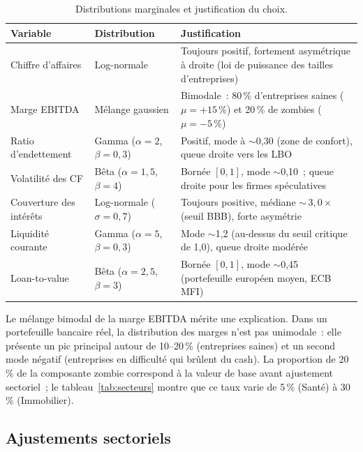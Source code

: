 \documentclass[12pt, a4paper, twoside, openright]{report}
\theoremstyle{definition}
\begin{document}
\begin{table}[htbp]
\centering
\caption{Distributions marginales et justification du choix.}
\label{tab:marginales}
\begin{tabular}{llp{6.5cm}}
\toprule
Variable & Distribution & Justification \\
\midrule
Chiffre d'affaires      & Log-normale & Toujours positif, fortement asymétrique à droite (loi de puissance des tailles d'entreprises) \\
Marge EBITDA            & Mélange gaussien & Bimodale~: 80\,\% d'entreprises saines ($\mu = +15\,\%$) et 20\,\% de zombies ($\mu = -5\,\%$) \\
Ratio d'endettement     & Gamma ($\alpha\!=\!2$, $\beta\!=\!0{,}3$) & Positif, mode à $\sim$0{,}30 (zone de confort), queue droite vers les LBO \\
Volatilité des CF       & Bêta ($\alpha\!=\!1{,}5$, $\beta\!=\!4$) & Bornée $[0, 1]$, mode $\sim$0{,}10~; queue droite pour les firmes spéculatives \\
Couverture des intérêts  & Log-normale ($\sigma\!=\!0{,}7$) & Toujours positive, médiane ${\sim}\,3{,}0\times$ (seuil BBB), forte asymétrie \\
Liquidité courante      & Gamma ($\alpha\!=\!5$, $\beta\!=\!0{,}3$) & Mode $\sim$1{,}2 (au-dessus du seuil critique de 1{,}0), queue droite modérée \\
Loan-to-value           & Bêta ($\alpha\!=\!2{,}5$, $\beta\!=\!3$) & Bornée $[0, 1]$, mode $\sim$0{,}45 (portefeuille européen moyen, ECB MFI) \\
\bottomrule
\end{tabular}
\end{table}

Le mélange bimodal de la marge EBITDA mérite une explication.
Dans un portefeuille bancaire réel, la distribution des marges n'est pas unimodale~: elle présente un pic principal autour de 10--20\,\% (entreprises saines) et un second mode négatif (entreprises en difficulté qui brûlent du cash).
La proportion de 20\,\% de la composante zombie correspond à la valeur de base avant ajustement sectoriel~; le tableau~\ref{tab:secteurs} montre que ce taux varie de 5\,\% (Santé) à 30\,\% (Immobilier).

\subsection{Ajustements sectoriels}
\end{document}
